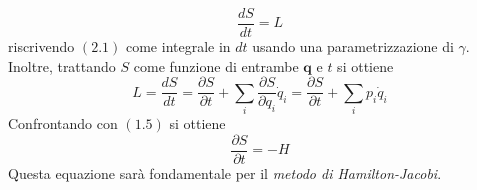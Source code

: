 \documentclass{article}
\begin{document}
\begin{equation}
    \frac{dS}{dt} = L \tag{2.5}
\end{equation}
riscrivendo $(2.1)$ come integrale in $dt$ usando una parametrizzazione di $\gamma$. Inoltre, trattando $S$ come funzione di entrambe $\mathbf{q}$ e $t$ si ottiene
\begin{equation}
    L = \frac{dS}{dt} = \frac{\partial S}{\partial t} + \sum_i \frac{\partial S}{\partial q_i}\dot{q}_i = \frac{\partial S}{\partial t} + \sum_i p_i\dot{q}_i \tag{2.6}
\end{equation}
Confrontando con $(1.5)$ si ottiene
\begin{equation}
    \frac{\partial S}{\partial t} = - H \tag{2.7}
\end{equation}
Questa equazione sarà fondamentale per il \textit{metodo di Hamilton-Jacobi}.

\newpage
\end{document}
